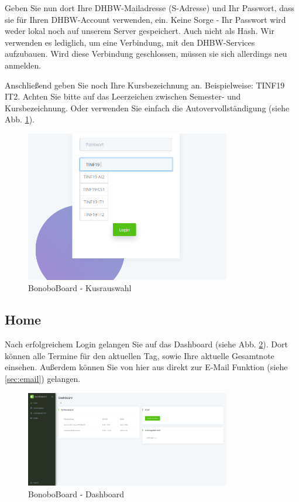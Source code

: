 \documentclass[a4paper,11pt]{scrartcl}
\begin{document}
Geben Sie nun dort Ihre DHBW-Mailadresse (\frqq{}S-Adresse\flqq{}) und Ihr Passwort, dass sie für Ihren DHBW-Account verwenden, ein. Keine Sorge - Ihr Passwort wird weder lokal noch auf unserem Server gespeichert. Auch nicht als Hash. Wir verwenden es lediglich, um eine Verbindung, mit den DHBW-Services aufzubauen. Wird diese Verbindung geschlossen, müssen sie sich allerdings neu anmelden.

\bigskip
Anschließend geben Sie noch Ihre Kursbezeichnung an. Beispielweise: \frqq{}TINF19 IT2\flqq{}. Achten Sie bitte auf das Leerzeichen zwischen Semester- und Kursbezeichnung. Oder verwenden Sie einfach die Autovervollständigung (siehe Abb. \ref{img:autocomplete}).
\begin{figure}[H]
	\begin{center}
		\includegraphics[width=0.8\textwidth]{autocomplete}
		\caption{BonoboBoard - Kusrauswahl}
		\label{img:autocomplete}
	\end{center}
\end{figure}
\noindent

\subsection{Home}
Nach erfolgreichem Login gelangen Sie auf das Dashboard (siehe Abb. \ref{img:dashboard}). Dort können alle Termine für den aktuellen Tag, sowie Ihre aktuelle Gesamtnote einsehen. Außerdem können Sie von hier aus direkt zur E-Mail Funktion (siehe \ref{sec:email}) gelangen.

\begin{figure}[H]
	\begin{center}
		\includegraphics[width=0.8\textwidth]{Dashboard}
		\caption{BonoboBoard - Dashboard}
		\label{img:dashboard}
	\end{center}
\end{figure}
\noindent
\end{document}
